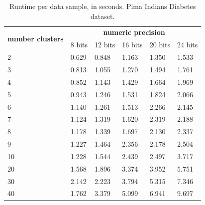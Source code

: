 \begin{table}[H]
\centering
\caption{Runtime per data sample, in seconds. Pima Indians Diabetes dataset.}
\label{table:runtimeKMPID}
\begin{tabular}{|l|l|l|l|l|l|}
\hline
\multirow{2}{*}{\textbf{number clusters}} & \multicolumn{5}{c|}{\textbf{numeric precision}}                                              \\ \cline{2-6}
                                          & 8 bits & 12 bits & 16 bits & 20 bits & 24 bits \\ \hline
2                                & 0.629           & 0.848            & 1.163            & 1.350            & 1.533            \\ \hline
3                                & 0.813           & 1.055            & 1.270            & 1.494            & 1.761            \\ \hline
4                                & 0.852           & 1.143            & 1.429            & 1.664            & 1.969            \\ \hline
5                                & 0.943           & 1.246            & 1.531            & 1.824            & 2.066            \\ \hline
6                                & 1.140           & 1.261            & 1.513            & 2.266            & 2.145            \\ \hline
7                                & 1.124           & 1.319            & 1.620            & 2.319            & 2.188            \\ \hline
8                                & 1.178           & 1.339            & 1.697            & 2.130            & 2.337            \\ \hline
9                                & 1.227           & 1.464            & 2.356            & 2.178            & 2.504            \\ \hline
10                               & 1.228           & 1.544            & 2.439            & 2.497            & 3.717            \\ \hline
20                               & 1.568           & 1.896            & 3.374            & 3.952            & 5.751            \\ \hline
30                               & 2.142           & 2.223            & 3.794            & 5.315            & 7.346            \\ \hline
40                               & 1.762           & 3.379            & 5.099            & 6.941            & 9.697            \\ \hline

\end{tabular}
\end{table}
